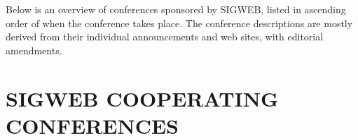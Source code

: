 \documentclass{scrartcl}
\begin{document}
    Below is an overview of conferences sponsored by SIGWEB, listed in ascending order of when the
    conference takes place. The conference descriptions are mostly derived from their individual
    announcements and web sites, with editorial amendments.








    \clearpage

    \section*{SIGWEB COOPERATING CONFERENCES}



\end{document}
